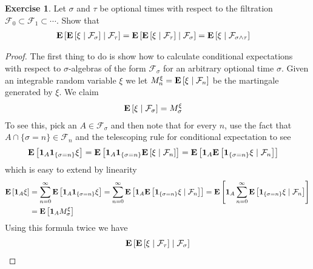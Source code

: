 \documentclass{amsart}
\theoremstyle{remark}
\theoremstyle{definition}
\newtheorem{ex}[thm]{Exercise}
\begin{document}
\begin{ex}Let $\sigma$ and $\tau$ be optional times with respect to
  the filtration $\mathcal{F}_0 \subset \mathcal{F}_1 \subset
  \cdots$.  Show that 
\begin{align*}
\cexpectationlong
{\mathcal{F}_\tau}{\cexpectationlong{\mathcal{F}_\sigma}{\xi}} &=
\cexpectationlong
{\mathcal{F}_\sigma}{\cexpectationlong{\mathcal{F}_\tau}{\xi}} = \cexpectationlong
{\mathcal{F}_{\sigma \wedge \tau}}{\xi}
\end{align*}
\end{ex}
\begin{proof}
The first thing to do is show how to calculate conditional
expectations with respect to $\sigma$-algebras of the form
$\mathcal{F}_\sigma$ for an arbitrary optional time $\sigma$.  Given
an integrable random variable $\xi$ we let $M^\xi_n =
\cexpectationlong{\mathcal{F}_n}{\xi}$ be the martingale generated by
$\xi$.  We claim
\begin{align*}
\cexpectationlong{\mathcal{F}_\sigma}{\xi} &= M^\xi_\sigma
\end{align*}
To see this, pick an $A \in \mathcal{F}_\sigma$ and then note that for
every $n$, use the fact that $A \cap \lbrace \sigma = n \rbrace \in
\mathcal{F}_n$ and the telescoping rule for conditional expectation to see
\begin{align*}
\expectation{\characteristic{A} \characteristic{\lbrace \sigma = n
    \rbrace } \xi} &= 
\expectation{\characteristic{A} \characteristic{\lbrace \sigma = n
    \rbrace } \cexpectationlong{\mathcal{F}_n}{\xi} } = 
\expectation{\characteristic{A} \cexpectationlong{\mathcal{F}_n}{\characteristic{\lbrace \sigma = n
    \rbrace } \xi} } 
\end{align*}
which is easy to extend by linearity 
\begin{align*}
\expectation{\characteristic{A} \xi} &= \sum_{n=0}^\infty \expectation{\characteristic{A} \characteristic{\lbrace \sigma = n
    \rbrace } \xi} = \sum_{n=0}^\infty \expectation{\characteristic{A} \cexpectationlong{\mathcal{F}_n}{\characteristic{\lbrace \sigma = n
    \rbrace } \xi}} = \expectation{\characteristic{A}
  \sum_{n=0}^\infty \cexpectationlong{\mathcal{F}_n}{\characteristic{\lbrace \sigma = n
    \rbrace } \xi}} \\
&= \expectation{\characteristic{A} M^\xi_\sigma}
\end{align*}
Using this formula twice we have
\begin{align*}
\cexpectationlong{\mathcal{F}_\sigma}{\cexpectationlong{\mathcal{F}_\tau}{\xi}}

\end{align*}
\end{proof}
\end{document}
